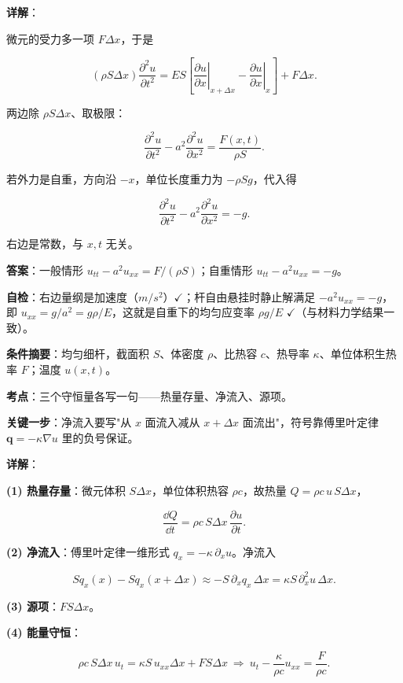 \textbf{详解}：

微元的受力多一项 $F\Delta x$，于是

\[
(\rho S\Delta x)\frac{\partial^2u}{\partial t^2}
=ES\left[\left.\frac{\partial u}{\partial x}\right|_{x+\Delta x}-\left.\frac{\partial u}{\partial x}\right|_{x}\right]+F\Delta x .
\]

两边除 $\rho S\Delta x$、取极限：

\[
\frac{\partial^2u}{\partial t^2}-a^2\frac{\partial^2u}{\partial x^2}=\frac{F(x,t)}{\rho S}.
\]

若外力是自重，方向沿 $-x$，单位长度重力为 $-\rho Sg$，代入得

\[
\frac{\partial^2u}{\partial t^2}-a^2\frac{\partial^2u}{\partial x^2}=-g .
\]

右边是常数，与 $x,t$ 无关。

\textbf{答案}：一般情形 $u_{tt}-a^2u_{xx}=F/(\rho S)$；自重情形 $u_{tt}-a^2u_{xx}=-g$。

\textbf{自检}：右边量纲是加速度（$\unit{m/s^2}$）$\checkmark$；杆自由悬挂时静止解满足 $-a^2u_{xx}=-g$，即 $u_{xx}=g/a^2=g\rho/E$，这就是自重下的均匀应变率 $\rho g/E$ $\checkmark$（与材料力学结果一致）。

\qbreak

\textbf{条件摘要}：均匀细杆，截面积 $S$、体密度 $\rho$、比热容 $c$、热导率 $\kappa$、单位体积生热率 $F$；温度 $u(x,t)$。

\textbf{考点}：三个守恒量各写一句——热量存量、净流入、源项。

\textbf{关键一步}：净流入要写"从 $x$ 面流入减从 $x+\Delta x$ 面流出"，符号靠傅里叶定律 $\mathbf q=-\kappa\nabla u$ 里的负号保证。

\textbf{详解}：

\textbf{(1) 热量存量}：微元体积 $S\Delta x$，单位体积热容 $\rho c$，故热量 $Q=\rho c\,u\,S\Delta x$，

\[
\frac{\dd Q}{\dd t}=\rho c\,S\Delta x\,\frac{\partial u}{\partial t}.
\]

\textbf{(2) 净流入}：傅里叶定律一维形式 $q_x=-\kappa\,\partial_xu$。净流入

\[
S q_x(x)-S q_x(x+\Delta x)
\approx-S\,\partial_xq_x\,\Delta x
=\kappa S\,\partial_x^2u\,\Delta x .
\]

\textbf{(3) 源项}：$F S\Delta x$。

\textbf{(4) 能量守恒}：

\[
\rho c\,S\Delta x\,u_t=\kappa S\,u_{xx}\Delta x+F S\Delta x
\ \Longrightarrow\
u_t-\frac{\kappa}{\rho c}u_{xx}=\frac{F}{\rho c}.
\]

